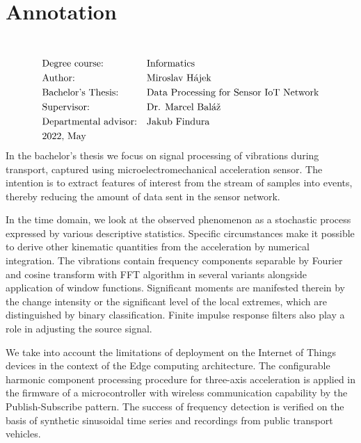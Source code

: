 \section*{Annotation}
\UniversityEN \\
\uppercase{\FacultyEN}
\vspace{-8pt}
{\setlength{\mathindent}{0cm}
\begin{align*}
&\text{Degree course:} && \text{\StudyProgrammeEN} \\
&\text{Author:} && \text{\Author} \\
&\text{\ThesisEN:} && \text{\TitleEN} \\
&\text{Supervisor:} && \text{\SupervisorEN} \\
&\text{Departmental advisor:} && \text{\PedagogicalSupervisorEN} \\
&\text{\DateEN}
\end{align*}}
In the bachelor's thesis we focus on signal processing of vibrations during transport, captured using
microelectromechanical acceleration sensor. The intention is to extract features of interest from the stream 
of samples into events, thereby reducing the amount of data sent in the sensor network.

In the time domain, we look at the observed phenomenon as a stochastic process expressed by various descriptive statistics.
Specific circumstances make it possible to derive other kinematic quantities from the acceleration by numerical integration. 
The vibrations contain frequency components separable by Fourier and cosine transform with FFT
algorithm in several variants alongside application of window functions. Significant moments
are manifested therein by the change intensity or the significant level of the local extremes, which are distinguished by
binary classification. Finite impulse response filters also play a role in adjusting the source signal.

We take into account the limitations of deployment on the Internet of Things devices in the context of the
Edge computing architecture. The configurable harmonic component processing procedure for
three-axis acceleration is applied in the firmware of a microcontroller with wireless communication capability 
by the Publish-Subscribe pattern. The success of frequency detection is verified on the basis of synthetic sinusoidal time series and 
recordings from public transport vehicles.
\emptypage 